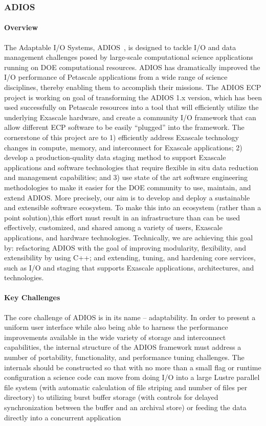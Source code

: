 \subsubsection{ ADIOS} 
\paragraph{Overview} 
The Adaptable I/O Systems, ADIOS~\cite{adios2-softwarex-2020,liu2014hello}, is designed to tackle I/O and data management challenges posed  by  large-scale computational science applications running on DOE computational resources. ADIOS has  dramatically  improved  the I/O performance of Petascale  applications from a   wide range of science disciplines, thereby enabling them to accomplish their missions. The ADIOS ECP project is working on goal of transforming the ADIOS 1.x version, which has been used successfully on Petascale resources into a tool that will efficiently utilize  the underlying Exascale hardware, and create a   community I/O framework that can allow different ECP software to be easily  “plugged” into the framework. The cornerstone of this project are to 1) efficiently  address Exascale technology changes in compute, memory, and interconnect for Exascale applications; 2) develop  a  production-quality data staging method to support Exascale applications and software  technologies that require flexible in situ data reduction and management capabilities; and 3) use state  of the  art software engineering methodologies to    make it   easier for the DOE community to    use, maintain, and extend ADIOS. More precisely, our aim is to    develop and deploy a   sustainable and extensible software ecosystem. To make this into an ecosystem (rather than a point solution),this effort must result in  an  infrastructure than can be used effectively, customized, and shared among a   variety of users, Exascale applications, and hardware technologies. Technically, we are achieving  this goal  by: refactoring ADIOS  with the  goal  of improving modularity, flexibility, and extensibility by using C++; and extending, tuning, and hardening core services, such as I/O and staging that supports Exascale applications, architectures, and technologies.

\paragraph{Key  Challenges}
The core challenge of ADIOS is in its name -- adaptability.  In order to present a uniform user interface while also being able to harness the performance improvements available in the wide variety of storage and interconnect capabilities, the internal structure of the ADIOS framework must address a number of portability, functionality, and performance tuning challenges.  The internals should be constructed so that with no more than a small flag or runtime configuration a science code can move from doing I/O into a large Lustre parallel file system (with automatic calculation of file striping and number of files per directory) to utilizing burst buffer storage (with controls for delayed synchronization between the buffer and an archival store) or feeding the data directly into a concurrent application   

